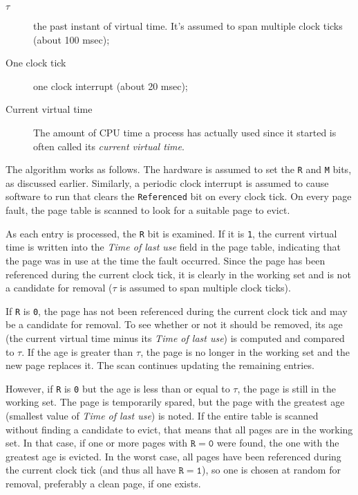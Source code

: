 \begin{description}
\item[\(\mathtt{\tau}\)] the past instant of virtual time. It's assumed to span multiple clock ticks
  (about 100 msec);
\item[One clock tick] one clock interrupt (about 20 msec);
\item[Current virtual time] The amount of CPU time a process has actually used since it
  started is often called its \emph{current virtual time}.
\end{description}

The algorithm works as follows. The hardware is assumed to set the \texttt{R} and
\texttt{M} bits, as discussed earlier. Similarly, a periodic clock interrupt is assumed to
cause software to run that clears the \texttt{Referenced} bit on every clock tick. On
every page fault, the page table is scanned to look for a suitable page to
evict.

As each entry is processed, the \texttt{R} bit is examined. If it is \texttt{1}, the
current virtual time is written into the \emph{Time of last use} field in the page table,
indicating that the page was in use at the time the fault occurred. Since the page has
been referenced during the current clock tick, it is clearly in the working set and is not
a candidate for removal (\(\mathtt{\tau}\) is assumed to span multiple clock ticks).

If \texttt{R} is \texttt{0}, the page has not been referenced during the current clock
tick and may be a candidate for removal. To see whether or not it should be removed, its
age (the current virtual time minus its \emph{Time of last use}) is computed and compared
to \(\mathtt{\tau}\). If the age is greater than \(\mathtt{\tau}\), the page is no longer in
the working set and the new page replaces it. The scan continues updating the remaining
entries.

However, if \texttt{R} is \texttt{0} but the age is less than or equal to \(\mathtt{\tau}\),
the page is still in the working set. The page is temporarily spared, but the page with
the greatest age (smallest value of \emph{Time of last use}) is noted. If the entire table
is scanned without finding a candidate to evict, that means that all pages are in the
working set. In that case, if one or more pages with \(\mathtt{R = 0}\) were found, the one
with the greatest age is evicted. In the worst case, all pages have been referenced during
the current clock tick (and thus all have \(\mathtt{R = 1}\)), so one is chosen at random
for removal, preferably a clean page, if one exists.

